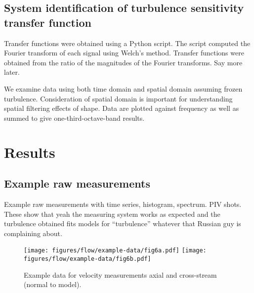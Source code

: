 \documentclass{jfm}
\begin{document}
\subsection{System identification of turbulence sensitivity transfer function}
Transfer functions were obtained using a Python script.  The script computed the Fourier transform of each signal using Welch's method.  Transfer functions were obtained from the ratio of the magnitudes of the Fourier transforms.  Say more later. 

We examine data using both time domain and spatial domain assuming frozen turbulence. Consideration of spatial domain is important for understanding spatial filtering effects of shape.  Data are plotted against frequency as well as summed to give one-third-octave-band results. 

	







\section{Results}

\subsection{Example raw measurements}
Example raw measurements with time series, histogram, spectrum. PIV shots.  These show that yeah the measuring system works as expected and the turbulence obtained fits models for ``turbulence'' whatever that Russian guy is complaining about. 

\begin{figure} 
\centerline{\texttt{[image: figures/flow/example-data/fig6a.pdf]}%
\texttt{[image: figures/flow/example-data/fig6b.pdf]}}
\caption{Example data for velocity measurements axial and cross-stream (normal to model).}
\end{figure}
\end{document}
